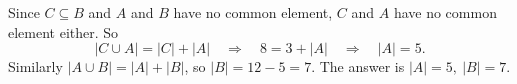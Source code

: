 Since $C\subseteq B$ and $A$ and $B$ have no common element, $C$ and $A$ have no common element either. So
\[|C\cup A|=|C|+|A|\quad\Longrightarrow\quad8=3+|A|\quad\Longrightarrow\quad|A|=5.\]
Similarly $|A\cup B|=|A|+|B|$, so $|B|=12-5=7$. The answer is $\boxed{|A|=5,\ |B|=7}$.
